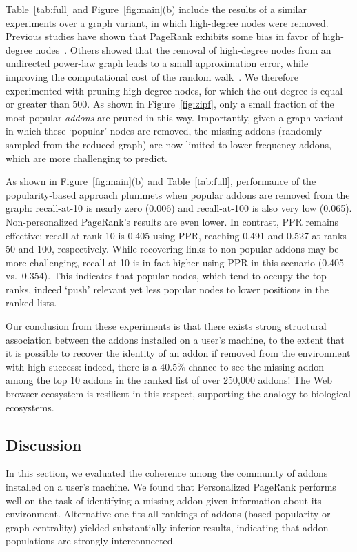 \documentclass[ijoc,nonblindrev]{informs3} %
\numberwithin{equation}{subsection}
\begin{document}
Table~\ref{tab:full} and Figure~\ref{fig:main}(b) include the results of a similar experiments over a graph variant, in which high-degree nodes were removed. Previous studies have shown that PageRank exhibits some bias in favor of high-degree nodes~\citep{tong2006center,budalakoti2012}. Others showed that the removal of high-degree nodes from an undirected power-law graph leads to a small approximation error, while improving the computational cost of the random walk~\cite{sarkar2010tractable}. We therefore experimented with pruning high-degree nodes, for which the out-degree is equal or greater than 500. As shown in Figure~\ref{fig:zipf}, only a small fraction of the most popular {\it addons} are pruned in this way. Importantly, given a graph variant in which these `popular' nodes are removed, the missing addons (randomly sampled from the reduced graph) are now limited to lower-frequency addons, which are more challenging to predict. 

As shown in Figure~\ref{fig:main}(b) and Table~\ref{tab:full}, performance of the popularity-based approach plummets when popular addons are removed from the graph: recall-at-10 is nearly zero (0.006) and recall-at-100 is also very low (0.065). Non-personalized PageRank's results are even lower. In contrast, PPR remains effective: recall-at-rank-10 is 0.405 using PPR, reaching 0.491 and 0.527 at ranks 50 and 100, respectively. While recovering links to non-popular addons may be more challenging, recall-at-10 is in fact higher using PPR in this scenario (0.405 vs.~0.354). This indicates that popular nodes, which tend to occupy the top ranks, indeed `push' relevant yet less popular nodes to lower positions in the ranked lists.  

Our conclusion from these experiments is that there exists strong structural association between the addons installed on a user's machine, to the extent that it is possible to recover the identity of an addon if removed from the environment with high success: indeed, there is a 40.5\% chance to see the missing addon among the top 10 addons in the ranked list of over 250,000 addons! The Web browser ecosystem is resilient in this respect, supporting the analogy to biological ecosystems.

\subsection{Discussion}

In this section, we evaluated the coherence among the community of addons installed on a user's machine. We found that Personalized PageRank performs well on the task of identifying a missing addon given information about its environment. Alternative one-fits-all rankings of addons (based popularity or graph centrality) yielded substantially inferior results, indicating that addon populations are strongly interconnected.  
\end{document}
